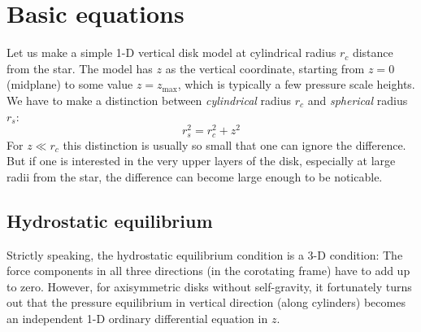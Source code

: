 \documentclass{book}
\begin{document}
\section{Basic equations}\label{sec-disk-vert-struct-basic-eqs}
Let us make a simple 1-D vertical disk model at cylindrical radius $r_c$
distance from the star. The model has $z$ as the vertical coordinate, starting
from $z=0$ (midplane) to some value $z=z_{\mathrm{max}}$, which is typically a
few pressure scale heights. We have to make a distinction between {\em cylindrical}
radius $r_c$ and {\em spherical} radius $r_s$:
\begin{equation}
r_s^2 = r_c^2 + z^2
\end{equation}
For $z\ll r_c$ this distinction is usually so small that one can ignore
the difference. But if one is interested in the very upper layers of the
disk, especially at large radii from the star, the difference can become
large enough to be noticable.

\subsection{Hydrostatic equilibrium}\label{sec-vertical-hydrostatic-equil}
Strictly speaking, the hydrostatic equilibrium condition is a 3-D condition: The
force components in all three directions (in the corotating frame) have to add
up to zero. However, for axisymmetric disks without self-gravity, it fortunately
turns out that the pressure equilibrium in vertical direction (along cylinders)
becomes an independent 1-D ordinary differential equation in $z$. 
\end{document}
